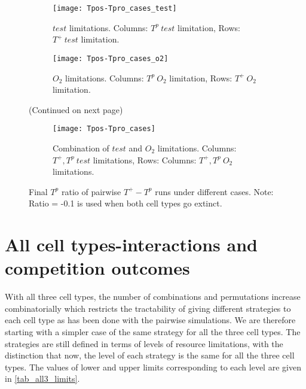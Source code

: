 \begin{figure}[h!]
  \centering
  \begin{subfigure}[b]{\textwidth}
    \centering
    \texttt{[image: Tpos-Tpro\_cases\_test]}
    \caption{$test$ limitations. Columns: $T^p\ test$ limitation, Rows: $T^+\ test$ limitation.}
    \label{fig_Tpos-Tpro_cases_test}
  \end{subfigure}
  \begin{subfigure}[b]{\textwidth}
    \centering
    \texttt{[image: Tpos-Tpro\_cases\_o2]}
    \caption{$O_2$ limitations. Columns: $T^p\ O_2$ limitation, Rows: $T^+\ O_2$ limitation.}
    \label{fig_Tpos-Tpro_cases_o2}
  \end{subfigure}
  \caption[]{(Continued on next page)}
\end{figure}
\begin{figure}[h!]\ContinuedFloat
  \centering
  \begin{subfigure}[b]{\textwidth}
    \centering
    \texttt{[image: Tpos-Tpro\_cases]}
    \caption{Combination  of $test$ and $O_2$ limitations. Columns: $T^+,T^p\ test$ limitations, Rows: Columns: $T^+,T^p\ O_2$ limitations.}
    \label{fig_Tpos-Tpro_cases_combi}
  \end{subfigure}
  \caption[Final $T^p$ ratio of pairwise $T^+ - T^p$ runs under different cases]{Final $T^p$ ratio of pairwise $T^+ - T^p$ runs under different cases. Note: Ratio = -0.1 is used when both cell types go extinct.}
  \label{fig_Tpos-Tpro_cases}
\end{figure}

\chapter{All cell types-interactions and competition outcomes}
With all three cell types, the number of combinations and permutations increase combinatorially which restricts the tractability of giving different strategies to each cell type as has been done with the pairwise simulations. We are therefore starting with a simpler case of the same strategy for all the three cell types. The strategies are still defined in terms of levels of resource limitations, with the distinction that now, the level of each strategy is the same for all the three cell types. The values of lower and upper limits corresponding to each level are given in \autoref{tab_all3_limits}.

